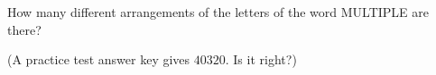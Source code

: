 How many different arrangements of the letters of the word MULTIPLE are there?

(A practice test answer key gives $40320$. Is it right?)
